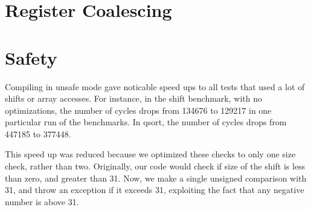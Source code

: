 \documentclass[11pt]{article}
\begin{document}
\section{Register Coalescing}

\section{Safety}

Compiling in unsafe mode gave noticable speed ups to all tests that used a lot
of shifts or array accesses. For instance, in the shift benchmark, with no
optimizations, the number of cycles drops from 134676 to 129217 in one particular
run of the benchmarks. In qsort, the number of cycles drops from 447185 to
377448.

This speed up was reduced because we optimized these checks to only one size
check, rather than two. Originally, our code would check if size of the shift is less than zero, and
greater than 31. Now, we make a single unsigned comparison with 31, and throw
an exception if it exceeds 31, exploiting the fact that any negative number is
above 31.
\end{document}
